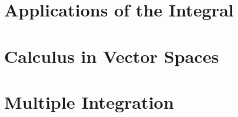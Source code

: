 \documentclass[english, 11pt, a4paper]{book}
\begin{document}
\part{Applications of the Integral}				%


\part{Calculus in Vector Spaces}  				%


\part{Multiple Integration}      				%


\backmatter%
%
\printindex

\end{document}
